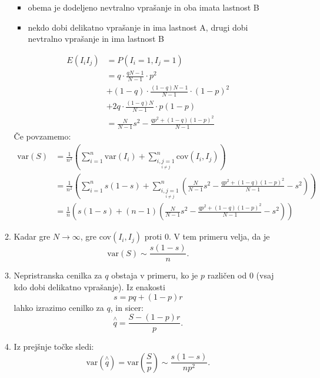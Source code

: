 \documentclass[12pt, letterpaper, twoside]{article}
\begin{document}
\begin{enumerate}
\begin{enumerate}
\begin{itemize}
			\item obema je dodeljeno nevtralno vprašanje in oba imata lastnost B
			\item nekdo dobi delikatno vprašanje in ima lastnost A, drugi dobi nevtralno vprašanje in ima lastnost B
		\end{itemize}
		\begin{align*}
		E(I_i I_j) &= P(I_i = 1,I_j =1) \\
		&= q \cdot \frac{qN-1}{N-1}\cdot p^2 \\ &+(1-q)\cdot\frac{(1-q)N-1}{N-1}\cdot(1-p)^2 \\ &+2q\cdot\frac{(1-q)N}{N-1}\cdot p(1-p) \\
		&=\frac{N}{N-1}s^2-\frac{qp^2+(1-q)(1-p)^2}{N-1}
		\end{align*}
		Če povzamemo:
		\begin{align*}
			\text{var}(S) &=\frac{1}{n^2}\left(\sum_{i=1}^{n}\text{var}(I_i)+\sum_{\underset{i\neq j}{i,j=1}}^{n}\text{cov}(I_i,I_j) \right) \\
			&=\frac{1}{n^2}\left(\sum_{i=1}^{n}s(1-s)+\sum_{\underset{i\neq j}{i,j=1}}^{n}\left(\frac{N}{N-1}s^2-\frac{qp^2+(1-q)(1-p)^2}{N-1}-s^2\right)\right) \\
			&=\frac{1}{n}\left(s(1-s)+(n-1)\left(\frac{N}{N-1}s^2-\frac{qp^2+(1-q)(1-p)^2}{N-1}-s^2\right)\right)
		\end{align*}
		
		\item Kadar gre $N \longrightarrow \infty$, gre cov$(I_i,I_j)$ proti 0. V tem primeru velja, da je
		$$\text{var}(S)\sim\frac{s(1-s)}{n}.$$
		
		\item Nepristranska cenilka za $q$ obstaja v primeru, ko je $p$ različen od 0 (vsaj kdo dobi delikatno vprašanje). Iz enakosti $$s=pq+(1-p)r $$
		lahko izrazimo cenilko za $q$, in sicer:
		$$\overset{\wedge}{q}=\frac{S-(1-p)r}{p}.$$
		\item Iz prejšnje točke sledi:
		$$\text{var}(\overset{\wedge}{q})=\text{var}\left(\frac{S}{p}\right)\sim\frac{s(1-s)}{np^2}.$$
		

\end{enumerate}
\end{enumerate}
\end{document}
